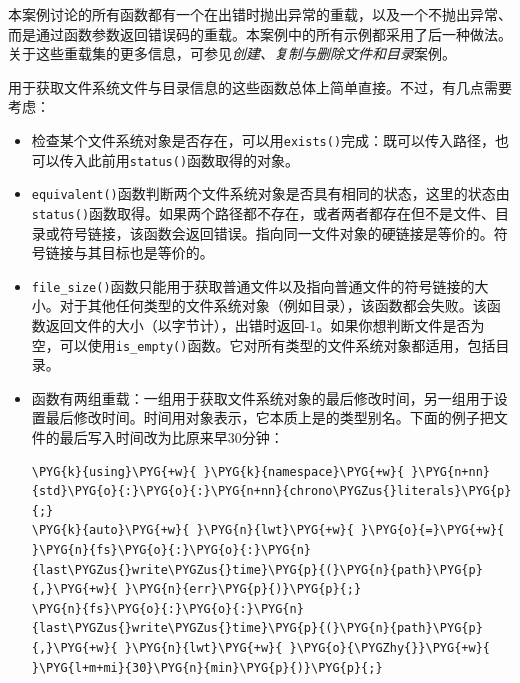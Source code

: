 
本案例讨论的所有函数都有一个在出错时抛出异常的重载，以及一个不抛出异常、而是通过函数参数返回错误码的重载。本案例中的所有示例都采用了后一种做法。关于这些重载集的更多信息，可参见\textit{创建、复制与删除文件和目录}案例。


用于获取文件系统文件与目录信息的这些函数总体上简单直接。不过，有几点需要考虑：



\begin{itemize}
\item 检查某个文件系统对象是否存在，可以用\texttt{exists()}完成：既可以传入路径，也可以传入此前用\texttt{status()}函数取得的对象。



\item \texttt{equivalent()}函数判断两个文件系统对象是否具有相同的状态，这里的状态由\texttt{status()}函数取得。如果两个路径都不存在，或者两者都存在但不是文件、目录或符号链接，该函数会返回错误。指向同一文件对象的硬链接是等价的。符号链接与其目标也是等价的。



\item \texttt{file\_\allowbreak{}size()}函数只能用于获取普通文件以及指向普通文件的符号链接的大小。对于其他任何类型的文件系统对象（例如目录），该函数都会失败。该函数返回文件的大小（以字节计），出错时返回-1。如果你想判断文件是否为空，可以使用\texttt{is\_\allowbreak{}empty()}函数。它对所有类型的文件系统对象都适用，包括目录。



\item {}函数有两组重载：一组用于获取文件系统对象的最后修改时间，另一组用于设置最后修改时间。时间用对象表示，它本质上是的类型别名。下面的例子把文件的最后写入时间改为比原来早30分钟：



\begin{codeblockbg}
\begin{Verbatim}[commandchars=\\\{\},breaklines=true,breakanywhere=true,fontsize=\codefont,xleftmargin=17bp]
\PYG{k}{using}\PYG{+w}{ }\PYG{k}{namespace}\PYG{+w}{ }\PYG{n+nn}{std}\PYG{o}{:}\PYG{o}{:}\PYG{n+nn}{chrono\PYGZus{}literals}\PYG{p}{;}
\PYG{k}{auto}\PYG{+w}{ }\PYG{n}{lwt}\PYG{+w}{ }\PYG{o}{=}\PYG{+w}{ }\PYG{n}{fs}\PYG{o}{:}\PYG{o}{:}\PYG{n}{last\PYGZus{}write\PYGZus{}time}\PYG{p}{(}\PYG{n}{path}\PYG{p}{,}\PYG{+w}{ }\PYG{n}{err}\PYG{p}{)}\PYG{p}{;}
\PYG{n}{fs}\PYG{o}{:}\PYG{o}{:}\PYG{n}{last\PYGZus{}write\PYGZus{}time}\PYG{p}{(}\PYG{n}{path}\PYG{p}{,}\PYG{+w}{ }\PYG{n}{lwt}\PYG{+w}{ }\PYG{o}{\PYGZhy{}}\PYG{+w}{ }\PYG{l+m+mi}{30}\PYG{n}{min}\PYG{p}{)}\PYG{p}{;}
\end{Verbatim}
\end{codeblockbg}



\end{itemize}
